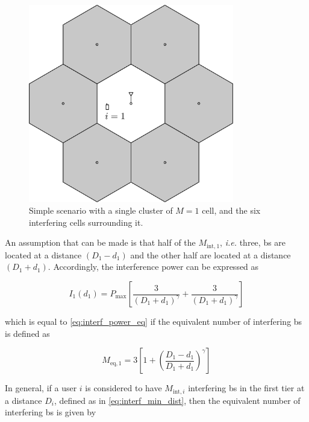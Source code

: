 \begin{figure}[t]
\begin{center}
    \includegraphics[width=0.8\textwidth]{./10.achievable_rates/img/cluster_1}
\end{center}
\caption{Simple scenario with a single cluster of $M = 1$ cell, and the six
    interfering cells surrounding it.}
\label{fig:cluster_1}
\end{figure}

An assumption that can be made is that half of the $M_{\text{int}, 1}$, \emph{i.e.} three, \gls{bs} are located at a distance $\left( D_1 - d_1 \right)$ and the
other half are located at a distance $\left( D_1 + d_1 \right)$. Accordingly,
the interference power can be expressed as

\begin{equation} \label{eq:interf_cluster_1}
    I_1\left(d_1\right) = P_{\max} \left[ \frac{3}{\left(D_1 + d_1
        \right)^\gamma} + \frac{3}{\left(D_1 + d_1 \right)^\gamma}\right]
\end{equation}

\noindent
which is equal to \eqref{eq:interf_power_eq} if the equivalent number of
interfering \gls{bs} is defined as

\begin{equation} \label{eq:meq_cluster_1}
    M_{\text{eq},1} = 3 \left[ 1 + \left(\frac{D_1 - d_1}{D_1 + d_1}
    \right)^\gamma\right]
\end{equation}

In general, if a user $i$ is considered to have $M_{\text{int}, i}$ interfering
\gls{bs} in the first tier at a distance $D_i$, defined as in
\eqref{eq:interf_min_dist}, then the equivalent number of interfering \gls{bs}
is given by

